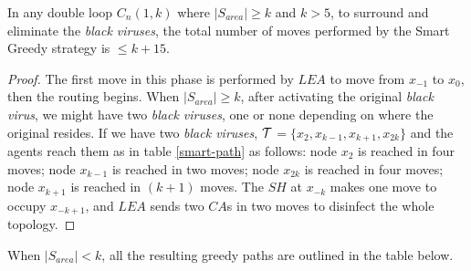 \begin{theorem}
In any double loop  $C_n(1,k)$ where $\left\vert{S_{area}}\right\vert \geq  k$ and $k>5$, to surround and eliminate the {\it black viruses},
 the total number of moves performed by the Smart Greedy strategy is $\leq k+15$.
\end{theorem}
\begin{proof}
The first move in this phase is performed by $LEA$ to move from $x_{-1}$ to $x_0$, then the routing begins.
When  $\left\vert{S_{area}}\right\vert \ge k$, after activating the original {\it black virus}, we might have two {\it black viruses}, one \bv or none depending on where the original \bv resides.
If we have two {\it black viruses}, ${\cal T}$$=\{x_{2},x_{k-1},x_{k+1},x_{2k}\}$ and the agents reach them as in table \ref{smart-path} as follows:
node $x_{2}$ is reached in four moves; node $x_{k-1}$ is reached in two moves; node $x_{2k}$ is reached in four moves; node $x_{k+1}$ is reached in $(k+1)$ moves.
The $SH$ at $x_{-k}$ makes one move to occupy $x_{-k+1}$, and $LEA$ sends two $CA$s in two moves to disinfect the whole topology.
\end{proof}

\noindent  When $\left\vert{S_{area}}\right\vert < k$, all the resulting greedy paths are outlined in the table below.

